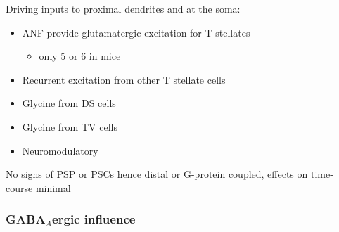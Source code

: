  Driving inputs to proximal dendrites and at the soma:
\begin{itemize}
\item ANF provide glutamatergic excitation for T stellates  \citep{Cant:1981,FerragamoGoldingEtAl:1998a,Alibardi:1998a}
\begin{itemize}
\item only 5 or 6 in mice \citep{FerragamoGoldingEtAl:1998a,CaoOertel:2010}
\end{itemize}
\item Recurrent excitation from other T stellate cells \citep{FerragamoGoldingEtAl:1998a}
\item Glycine from DS cells \citep{FerragamoGoldingEtAl:1998a}
\item Glycine from TV cells \citep{WickesbergOertel:1990,ZhangOertel:1993b}
\item Neuromodulatory
\end{itemize}
     No signs of PSP or PSCs hence distal or G-protein coupled, effects on time-course minimal

\subsubsection{GABA$_{A}$ergic influence}






